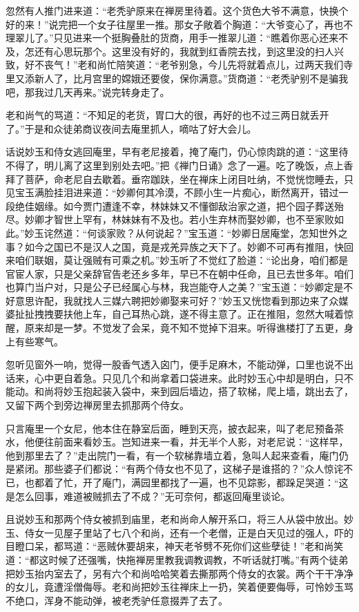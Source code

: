 \documentclass[12pt,oneside]{book}
\begin{document}
忽然有人推门进来道：“老秃驴原来在禅房里待着。这个货色大爷不满意，快换个好的来！”说完把一个女子往屋里一推。那女子敞着个胸道：“大爷变心了，再也不理翠儿了。”只见进来一个挺胸叠肚的货商，用手一推翠儿道：“瞧着你恶心还来不及，怎还有心思玩那个。这里没有好的，我就到红香院去找，到这里没的扫人兴致，好不丧气！”老和尚忙陪笑道：“老爷别急，今儿先将就着点儿，过两天我们寺里又添新人了，比月宫里的嫦娥还要俊，保你满意。”货商道：“老秃驴别不是骗我吧，那我过几天再来。”说完转身走了。

老和尚气的骂道：“不知足的老货，胃口大的很，再好的也不过三两日就丢开了。”于是和众徒弟商议夜间去庵里抓人，嘀咕了好大会儿。

话说妙玉和侍女逃回庵里，早有老尼接着，掩了庵门，仍心惊肉跳的道：“这里待不得了，明儿离了这里到别处去吧。”把《禅门日诵》念了一遍。吃了晚饭，点上香拜了菩萨，命老尼自去歇着。垂帘跏趺，坐在禅床上闭目吐纳，不觉恍惚睡去，只见宝玉满脸挂泪进来道：“妙卿何其冷漠，不顾小生一片痴心，断然离开，错过一段绝佳姻缘。如今贾门遭逢不幸，林妹妹又不懂御敌治家之道，把个园子葬送殆尽。妙卿才智世上罕有，林妹妹有不及也。若小生弃林而娶妙卿，也不至家败如此。”妙玉诧然道：“何谈家败？从何说起？”宝玉道：“妙卿日居庵堂，怎知世外之事？如今之国已不是汉人之国，竟是戎羌异族之天下了。妙卿不可再有推阻，快回来咱们联姻，莫让强贼有可乘之机。”妙玉听了不觉红了脸道：“论出身，咱们都是官宦人家，只是父亲辞官告老还乡多年，早已不在朝中任命，且已去世多年。咱们也算门当户对，只是公子已经属心与林，我岂能夺人之美？”宝玉道：“妙卿定是不好意思许配，我就找人三媒六聘把妙卿娶来可好？”妙玉又恍惚看到那边来了众媒婆扯扯拽拽要扶他上车，自己耳热心跳，遂不得主意了。正在推阻，忽然大喊着惊醒，原来却是一梦。不觉发了会呆，竟不知不觉掉下泪来。听得谯楼打了五更，身上有些寒气。

忽听见窗外一响，觉得一股香气透入囟门，便手足麻木，不能动弹，口里也说不出话来，心中更自着急。只见几个和尚拿着口袋进来。此时妙玉心中却是明白，只不能动。和尚将妙玉抱起装入袋中，来到园后墙边，搭了软梯，爬上墙，跳出去了，又留下两个到旁边禅房里去抓那两个侍女。

只言庵里一个女尼，他本住在静室后面，睡到天亮，披衣起来，叫了老尼预备茶水，他便往前面来看妙玉。岂知进来一看，并无半个人影，对老尼说：“这样早，他到那里去了？”走出院门一看，有一个软梯靠墙立着，急叫人起来查看，庵门仍是紧闭。那些婆子们都说：“有两个侍女也不见了，这梯子是谁搭的？”众人惊诧不已，也都着了忙，开了庵门，满园里都找了一遍，也不见踪影，都跺足哭道：“这是怎么回事，难道被贼抓去了不成？”无可奈何，都返回庵里谈论。

且说妙玉和那两个侍女被抓到庙里，老和尚命人解开系口，将三人从袋中放出。妙玉、侍女一见屋子里站了七八个和尚，还有一个老僧，正是白天见过的强人，吓的目瞪口呆，都骂道：“恶贼休要胡来，神天老爷劈不死你们这些孽徒！”老和尚笑道：“都这时候了还强嘴，快拖禅房里教我调教调教，不听话就打嘴。”有两个徒弟把妙玉抬内室去了，另有六个和尚哈哈笑着去撕那两个侍女的衣裳。两个干干净净的女儿，竟遭淫僧侮辱。老和尚把妙玉往禅床上一扔，笑着便要侮辱，可怜妙玉骂不绝口，浑身不能动弹，被老秃驴任意掇弄了去了。
\end{document}
